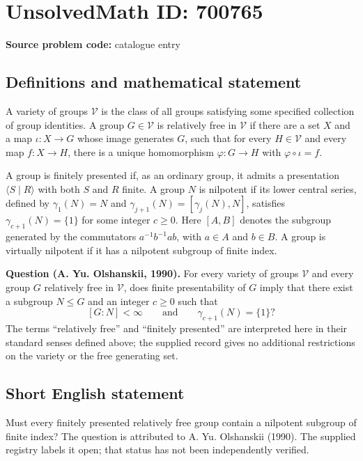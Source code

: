 \documentclass[11pt]{article}
\begin{document}
\section*{UnsolvedMath ID: 700765}
\textbf{Source problem code:} catalogue entry
\subsection{Definitions and mathematical statement}
A variety of groups \(\mathcal V\) is the class of all groups satisfying some specified collection of group identities. A group \(G\in\mathcal V\) is relatively free in \(\mathcal V\) if there are a set \(X\) and a map \(\iota:X\to G\) whose image generates \(G\), such that for every \(H\in\mathcal V\) and every map \(f:X\to H\), there is a unique homomorphism \(\varphi:G\to H\) with \(\varphi\circ\iota=f\).

A group is finitely presented if, as an ordinary group, it admits a presentation \(\langle S\mid R\rangle\) with both \(S\) and \(R\) finite. A group \(N\) is nilpotent if its lower central series, defined by \(\gamma_1(N)=N\) and \(\gamma_{j+1}(N)=[\gamma_j(N),N]\), satisfies \(\gamma_{c+1}(N)=\{1\}\) for some integer \(c\geq 0\). Here \([A,B]\) denotes the subgroup generated by the commutators \(a^{-1}b^{-1}ab\), with \(a\in A\) and \(b\in B\). A group is virtually nilpotent if it has a nilpotent subgroup of finite index.

\textbf{Question (A. Yu. Olshanskii, 1990).} For every variety of groups \(\mathcal V\) and every group \(G\) relatively free in \(\mathcal V\), does finite presentability of \(G\) imply that there exist a subgroup \(N\leq G\) and an integer \(c\geq 0\) such that
\[
[G:N]<\infty
\qquad\text{and}\qquad
\gamma_{c+1}(N)=\{1\}?
\]
The terms ``relatively free'' and ``finitely presented'' are interpreted here in their standard senses defined above; the supplied record gives no additional restrictions on the variety or the free generating set.
\subsection{Short English statement}
Must every finitely presented relatively free group contain a nilpotent subgroup of finite index? The question is attributed to A. Yu. Olshanskii (1990). The supplied registry labels it open; that status has not been independently verified.
\end{document}
